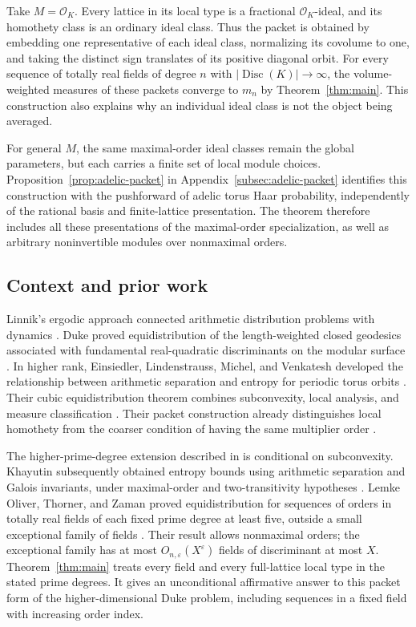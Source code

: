 \documentclass[11pt]{article}
\theoremstyle{remark}
\DeclareMathOperator{\Disc}{Disc}
\newcommand{\eps}{\varepsilon}
\newcommand{\cO}{\mathcal O}
\numberwithin{equation}{section}
\begin{document}
Take $M=\cO_K$. Every lattice in its local type is a fractional
$\cO_K$-ideal, and its homothety class is an ordinary ideal class.
Thus the packet is obtained by embedding one representative of each
ideal class, normalizing its covolume to one, and taking the distinct
sign translates of its positive diagonal orbit. For every sequence of
totally real fields of degree $n$ with $|\Disc(K)|\to\infty$, the
volume-weighted measures of these packets converge to $m_n$ by
Theorem~\ref{thm:main}. This construction also explains why an individual
ideal class is not the object being averaged.

For general $M$, the same maximal-order ideal classes remain the global
parameters, but each carries a finite set of local module choices.
Proposition~\ref{prop:adelic-packet} in Appendix~\ref{subsec:adelic-packet}
identifies this construction with the
pushforward of adelic torus Haar probability, independently of the
rational basis and finite-lattice presentation. The theorem therefore
includes all these presentations of the maximal-order specialization,
as well as arbitrary noninvertible modules over nonmaximal orders.

\subsection*{Context and prior work}

Linnik's ergodic approach connected arithmetic distribution problems
with dynamics \cite{Linnik1968}. Duke proved equidistribution of the
length-weighted closed geodesics associated with fundamental
real-quadratic discriminants on the modular surface
\cite[Theorem~1]{Duke1988}. In higher rank, Einsiedler, Lindenstrauss,
Michel, and Venkatesh developed the relationship between arithmetic
separation and entropy for periodic torus orbits \cite{ELMV2009}.
Their cubic equidistribution theorem combines subconvexity, local
analysis, and measure classification
\cite[Theorem~1.4]{ELMV2011}. Their packet construction already
distinguishes local homothety from the coarser condition of having the
same multiplier order \cite[Section~5.5]{ELMV2011}.

The higher-prime-degree extension described in
\cite[Section~1.6.3]{ELMV2011} is conditional on subconvexity.
Khayutin subsequently obtained entropy bounds using arithmetic
separation and Galois invariants, under maximal-order and
two-transitivity hypotheses \cite[Theorem~1.1]{Khayutin2019}.
Lemke Oliver, Thorner, and Zaman proved equidistribution for sequences
of orders in totally real fields of each fixed prime degree at least five,
outside a small
exceptional family of fields \cite[Theorem~2.3]{LOTZ2024}.
Their result allows nonmaximal orders; the exceptional family has at
most $O_{n,\eps}(X^\eps)$ fields of discriminant at most $X$.
Theorem~\ref{thm:main} treats every field and every full-lattice local
type in the stated prime degrees. It gives an unconditional affirmative
answer to this packet form of the higher-dimensional Duke problem,
including sequences in a fixed field with increasing order index.
\end{document}
